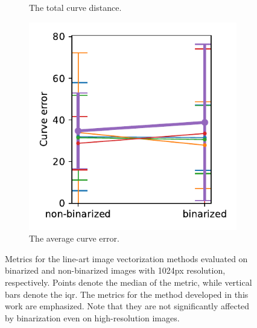 \begin{figure}[h]
\begin{subfigure}{.3\textwidth}
    \caption{The total curve distance.}
\end{subfigure}
    \begin{subfigure}{.3\textwidth}
    \centering
    \includegraphics[width=\textwidth]{graphics/eval/curve error_True_1024-1.024_tonari.pdf}
    \caption{The average curve error.}
\end{subfigure}
    \caption{Metrics for the line-art image vectorization methods evaluated on binarized and non-binarized images with 1024px resolution, respectively. Points denote the median of the metric, while vertical bars denote the \gls{iqr}. The metrics for the method developed in this work are emphasized. Note that they are not significantly affected by binarization even on high-resolution images.}
    \label{fig:metric_True_1024_tonari}
\end{figure}

